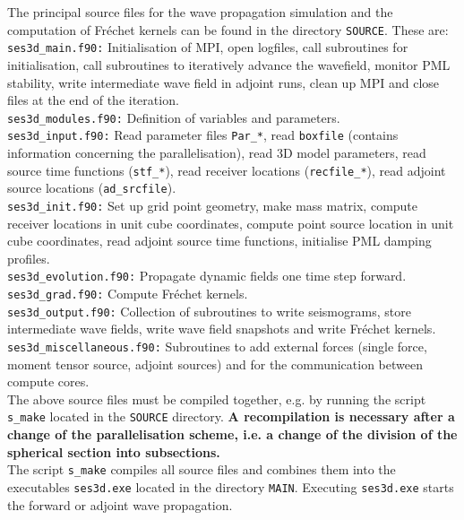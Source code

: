 The principal source files for the wave propagation simulation and the computation of Fr\'{e}chet kernels can be found in the directory \texttt{SOURCE}. These are:\\[5pt]
\texttt{ses3d\_main.f90:} Initialisation of MPI, open logfiles, call subroutines for initialisation, call subroutines to iteratively advance the wavefield, monitor PML stability, write intermediate wave field in adjoint runs, clean up MPI and close files at the end of the iteration.\\[5pt]
\texttt{ses3d\_modules.f90:} Definition of variables and parameters.\\[5pt]
\texttt{ses3d\_input.f90:} Read parameter files \texttt{Par\_*}, read \texttt{boxfile} (contains information concerning the parallelisation), read 3D model parameters, read source time functions (\texttt{stf\_*}), read receiver locations (\texttt{recfile\_*}), read adjoint source locations (\texttt{ad\_srcfile}).\\[5pt]
\texttt{ses3d\_init.f90:} Set up grid point geometry, make mass matrix, compute receiver locations in unit cube coordinates, compute point source location in unit cube coordinates, read adjoint source
time functions, initialise PML damping profiles.\\[5pt]
\texttt{ses3d\_evolution.f90:} Propagate dynamic fields one time step forward.\\[5pt]
\texttt{ses3d\_grad.f90:} Compute Fr\'{e}chet kernels.\\[5pt]
\texttt{ses3d\_output.f90:} Collection of subroutines to write seismograms, store intermediate wave fields, write wave field snapshots and write Fr\'{e}chet kernels.\\[5pt]
\texttt{ses3d\_miscellaneous.f90:} Subroutines to add external forces (single force, moment tensor source, adjoint sources) and for the communication between compute cores.\\[5pt]
The above source files must be compiled together, e.g. by running the script \texttt{s\_make} located in the \texttt{SOURCE} directory. \textbf{A recompilation is necessary after a change of
the parallelisation scheme, i.e. a change of the division of the spherical section into subsections.}\\[5pt]
The script \texttt{s\_make} compiles all source files and combines them into the executables \texttt{ses3d.exe} located in the directory \texttt{MAIN}. Executing \texttt{ses3d.exe}
starts the forward or adjoint wave propagation.


